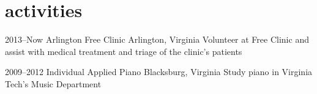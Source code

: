 \documentclass[]{friggeri-cv}
\begin{document}

\section{activities}

\begin{entrylist}

\entry
{2013--Now}
{Arlington Free Clinic}
{Arlington, Virginia}
{Volunteer at Free Clinic and assist with medical treatment and triage of the clinic's patients}

\entry
{2009--2012}
{Individual Applied Piano}
{Blacksburg, Virginia}
{Study piano in Virginia Tech's Music Department}
\end{entrylist}
\end{document}
